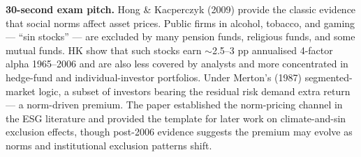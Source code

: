 \documentclass[11pt]{article}
\begin{document}
\begin{keybox}
\textbf{30-second exam pitch.} Hong \& Kacperczyk (2009) provide the classic evidence that social norms affect asset prices. Public firms in alcohol, tobacco, and gaming --- ``sin stocks'' --- are excluded by many pension funds, religious funds, and some mutual funds. HK show that such stocks earn $\sim$2.5--3 pp annualised 4-factor alpha 1965--2006 and are also less covered by analysts and more concentrated in hedge-fund and individual-investor portfolios. Under Merton's (1987) segmented-market logic, a subset of investors bearing the residual risk demand extra return --- a norm-driven premium. The paper established the norm-pricing channel in the ESG literature and provided the template for later work on climate-and-sin exclusion effects, though post-2006 evidence suggests the premium may evolve as norms and institutional exclusion patterns shift.
\end{keybox}
\end{document}
